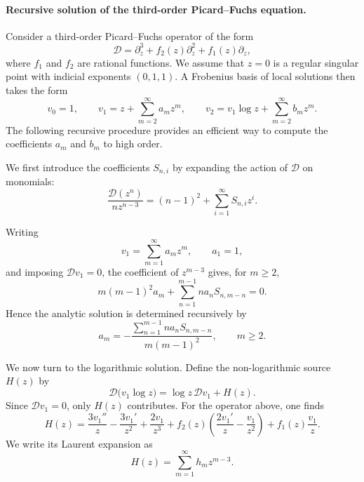 \documentclass[11pt, a4paper]{article}
\numberwithin{equation}{section}
\begin{document}
\paragraph{Recursive solution of the third-order Picard--Fuchs equation.}
Consider a third-order Picard--Fuchs operator of the form
\begin{equation}
  \mathcal{D}
  =
  \partial_z^3
  + f_2(z)\partial_z^2
  + f_1(z)\partial_z ,
\end{equation}
where \(f_1\) and \(f_2\) are rational functions. We assume that \(z=0\) is a regular singular point with indicial exponents \((0,1,1)\). A Frobenius basis of local solutions then takes the form
\begin{equation}
  v_0 = 1, \qquad
  v_1 = z + \sum_{m=2}^{\infty} a_m z^m, \qquad
  v_2 = v_1 \log z + \sum_{m=2}^{\infty} b_m z^m .
\end{equation}
The following recursive procedure provides an efficient way to compute the coefficients
\(a_m\) and \(b_m\) to high order.

We first introduce the coefficients \(S_{n,i}\) by expanding the action of
\(\mathcal{D}\) on monomials:
\begin{equation}
  \frac{\mathcal{D}(z^n)}{n z^{n-3}}
  =
  (n-1)^2
  +
  \sum_{i=1}^{\infty} S_{n,i} z^i .
\end{equation}

Writing
\begin{equation}
  v_1 = \sum_{m=1}^{\infty} a_m z^m,
  \qquad a_1=1,
\end{equation}
and imposing \(\mathcal{D}v_1=0\), the coefficient of \(z^{m-3}\) gives, for
\(m\geq 2\),
\begin{equation}
  m(m-1)^2 a_m
  +
  \sum_{n=1}^{m-1}
  n a_n S_{n,m-n}
  =
  0.
\end{equation}
Hence the analytic solution is determined recursively by
\begin{equation}
  a_m
  =
  -
  \frac{
    \sum_{n=1}^{m-1}
    n a_n S_{n,m-n}
  }{
    m(m-1)^2
  },
  \qquad m\geq 2.
\end{equation}

We now turn to the logarithmic solution. Define the non-logarithmic source
\(H(z)\) by
\begin{equation}
  \mathcal{D}\bigl(v_1\log z\bigr)
  =
  \log z \, \mathcal{D}v_1
  +
  H(z).
\end{equation}
Since \(\mathcal{D}v_1=0\), only \(H(z)\) contributes. For the operator above,
one finds
\begin{equation}
  H(z)
  =
  \frac{3v_1''}{z}
  -
  \frac{3v_1'}{z^2}
  +
  \frac{2v_1}{z^3}
  +
  f_2(z)
  \left(
    \frac{2v_1'}{z}
    -
    \frac{v_1}{z^2}
  \right)
  +
  f_1(z)\frac{v_1}{z}.
\end{equation}
We write its Laurent expansion as
\begin{equation}
  H(z)
  =
  \sum_{m=1}^{\infty} h_m z^{m-3}.
\end{equation}
\end{document}
